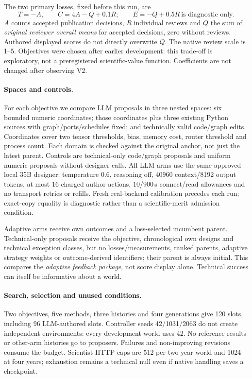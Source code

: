 \documentclass{article}
\begin{document}
The two primary losses, fixed before this run, are
\begin{equation}
 T=-A,\qquad C=4A-Q+0.1R;\qquad E=-Q+0.5R\ \text{is diagnostic only}.
 \label{eq:losses}
\end{equation}
$A$ counts accepted publication decisions, $R$ individual reviews and $Q$ the sum
of \emph{original reviewer overall means} for accepted decisions, zero without
reviews. Authored displayed scores do not directly overwrite $Q$. The native
review scale is 1--5. Objectives were chosen after earlier development: this
trade-off is exploratory, not a preregistered scientific-value function.
Coefficients are not changed after observing V2.

\paragraph{Spaces and controls.}
For each objective we compare LLM proposals in three nested spaces: six bounded
numeric coordinates; those coordinates plus three existing Python sources with
graph/ports/schedules fixed; and technically valid code/graph edits. Coordinates
cover two tensor thresholds, bias, memory cost, router threshold and process
count. Each domain is checked against the original anchor, not just the latest
parent. Controls are technical-only code/graph proposals and uniform numeric
proposals without designer calls. All LLM arms use the same approved local 35B
designer: temperature 0.6, reasoning off, 40960 context/8192 output tokens,
at most 16 charged author actions, 10/900\,s connect/read allowances and no transport
retries or refills. Fresh real-backend calibration precedes each run; exact-copy
equality is diagnostic rather than a scientific-merit admission condition.

Adaptive arms receive own outcomes and a loss-selected incumbent parent.
Technical-only proposals receive the objective, chronological own designs and
technical exception classes, but no losses/measurements, ranked parents,
adaptive strategy weights or outcome-derived identifiers; their parent is
always initial. This compares the \emph{adaptive feedback package}, not score
display alone. Technical success can itself be informative about a world.

\paragraph{Search, selection and unused conditions.}
Two objectives, five methods, three histories and four generations give 120
slots, including 96 LLM-authored slots. Controller seeds 42/1031/2063 do not create
independent environments: every development world uses 42. No reference results
or other-arm histories go to proposers. Failures and non-improving revisions
consume the budget. Scientist HTTP caps are 512 per two-year world and 1024 at
four years; exhaustion remains a technical null even if native handling saves
a checkpoint.
\end{document}
